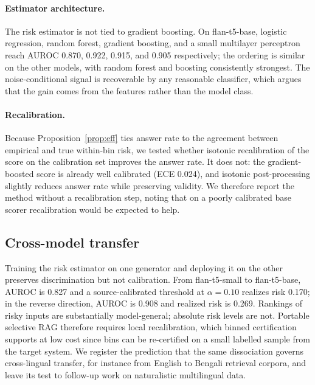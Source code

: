 \documentclass[11pt]{article}
\begin{document}
\paragraph{Estimator architecture.}
The risk estimator is not tied to gradient boosting. On flan-t5-base,
logistic regression, random forest, gradient boosting, and a small
multilayer perceptron reach AUROC 0.870, 0.922, 0.915, and 0.905
respectively; the ordering is similar on the other models, with random
forest and boosting consistently strongest. The noise-conditional
signal is recoverable by any reasonable classifier, which argues that
the gain comes from the features rather than the model class.

\paragraph{Recalibration.}
Because Proposition~\ref{prop:eff} ties answer rate to the agreement
between empirical and true within-bin risk, we tested whether isotonic
recalibration of the score on the calibration set improves the answer
rate. It does not: the gradient-boosted score is already well
calibrated (ECE 0.024), and isotonic post-processing slightly reduces
answer rate while preserving validity. We therefore report the method
without a recalibration step, noting that on a poorly calibrated base
scorer recalibration would be expected to help.

\subsection{Cross-model transfer}\label{sec:transfer}
Training the risk estimator on one generator and deploying it on the
other preserves discrimination but not calibration. From flan-t5-small
to flan-t5-base, AUROC is 0.827 and a source-calibrated threshold at
$\alpha = 0.10$ realizes risk 0.170; in the reverse direction, AUROC
is 0.908 and realized risk is 0.269. Rankings of risky inputs are
substantially model-general; absolute risk levels are not. Portable
selective RAG therefore requires local recalibration, which binned
certification supports at low cost since bins can be re-certified on a
small labelled sample from the target system. We register the
prediction that the same dissociation governs cross-lingual transfer,
for instance from English to Bengali retrieval corpora, and leave its
test to follow-up work on naturalistic multilingual data.
\end{document}
